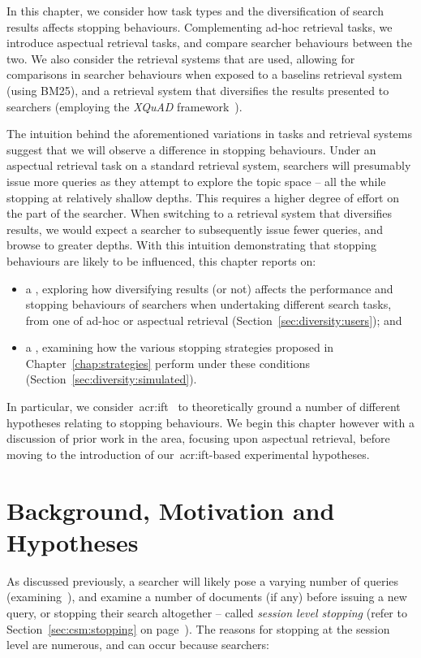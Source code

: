 In this chapter, we consider how task types and the diversification of search results affects stopping behaviours. Complementing ad-hoc retrieval tasks, we introduce aspectual retrieval tasks, and compare searcher behaviours between the two. We also consider the retrieval systems that are used, allowing for comparisons in searcher behaviours when exposed to a baselins retrieval system (using BM25), and a retrieval system that diversifies the results presented to searchers (employing the \emph{XQuAD} framework~\citep{santos2010query_reformulations_diversification}).

The intuition behind the aforementioned variations in tasks and retrieval systems suggest that we will observe a difference in stopping behaviours. Under an aspectual retrieval task on a standard retrieval system, searchers will presumably issue more queries as they attempt to explore the topic space -- all the while stopping at relatively shallow depths. This requires a higher degree of effort on the part of the searcher. When switching to a retrieval system that diversifies results, we would expect a searcher to subsequently issue fewer queries, and browse to greater depths. With this intuition demonstrating that stopping behaviours are likely to be influenced, this chapter reports on:

\begin{itemize}
    \item{a , exploring how diversifying results (or not) affects the performance and stopping behaviours of searchers when undertaking different search tasks, from one of ad-hoc or aspectual retrieval (Section~\ref{sec:diversity:users}); and}
    \item{a , examining how the various stopping strategies proposed in Chapter~\ref{chap:strategies} perform under these conditions (Section~\ref{sec:diversity:simulated}).}
\end{itemize}

In particular, we consider~\gls{acr:ift}~\citep{pirolli1999ift} to theoretically ground a number of different hypotheses relating to stopping behaviours. We begin this chapter however with a discussion of prior work in the area, focusing upon aspectual retrieval, before moving to the introduction of our~\gls{acr:ift}-based experimental hypotheses.

\section{Background, Motivation and Hypotheses}\label{sec:diversity:background}
As discussed previously, a searcher will likely pose a varying number of queries (examining~), and examine a number of documents (if any) before issuing a new query, or stopping their search altogether -- called \emph{session level stopping} (refer to Section~\ref{sec:csm:stopping} on page~\pageref{sec:csm:stopping}). The reasons for stopping at the session level are numerous, and can occur because searchers:

